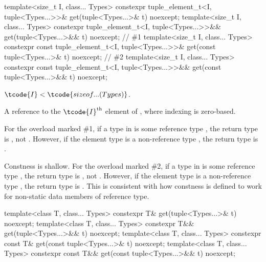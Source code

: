 %
\begin{itemdecl}
template<size_t I, class... Types>
  constexpr tuple_element_t<I, tuple<Types...>>&
    get(tuple<Types...>& t) noexcept;
template<size_t I, class... Types>
  constexpr tuple_element_t<I, tuple<Types...>>&&
    get(tuple<Types...>&& t) noexcept;        // \#1
template<size_t I, class... Types>
  constexpr const tuple_element_t<I, tuple<Types...>>&
    get(const tuple<Types...>& t) noexcept;   // \#2
template<size_t I, class... Types>
  constexpr const tuple_element_t<I, tuple<Types...>>&& get(const tuple<Types...>&& t) noexcept;
\end{itemdecl}

\begin{itemdescr}
\pnum
\mandates
$\tcode{I} < \tcode{sizeof...(Types)}$.

\pnum
\returns
A reference to the $\tcode{I}^\text{th}$ element of , where
indexing is zero-based.

\pnum
\begin{note}
For the overload marked \#1,
if a type  in  is some reference type ,
the return type is , not .
However, if the element type is a non-reference type ,
the return type is .
\end{note}

\pnum
\begin{note}
Constness is shallow.
For the overload marked \#2,
if a type  in  is some reference type ,
the return type is , not .
However, if the element type is a non-reference type ,
the return type is .
This is consistent with how constness is defined to work
for non-static data members of reference type.
\end{note}
\end{itemdescr}

%
\begin{itemdecl}
template<class T, class... Types>
  constexpr T& get(tuple<Types...>& t) noexcept;
template<class T, class... Types>
  constexpr T&& get(tuple<Types...>&& t) noexcept;
template<class T, class... Types>
  constexpr const T& get(const tuple<Types...>& t) noexcept;
template<class T, class... Types>
  constexpr const T&& get(const tuple<Types...>&& t) noexcept;
\end{itemdecl}

